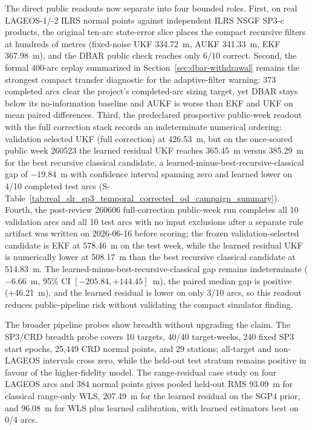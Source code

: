 \documentclass{article}
\begin{document}
The direct public readouts now separate into four bounded roles. First, on real LAGEOS-1/-2 ILRS normal points against independent ILRS NSGF SP3-c products, the original ten-arc state-error slice places the compact recursive filters at hundreds of metres (fixed-noise UKF 334.72~m, AUKF 341.33~m, EKF 367.98~m), and the DBAR public check reaches only 6/10 correct. Second, the formal 400-arc replay summarized in Section~\ref{sec:dbar-withdrawal} remains the strongest compact transfer diagnostic for the adaptive-filter warning: 373 completed arcs clear the project's completed-arc sizing target, yet DBAR stays below its no-information baseline and AUKF is worse than EKF and UKF on mean paired differences. Third, the predeclared prospective public-week readout with the full correction stack records an indeterminate numerical ordering: validation selected UKF (full correction) at 426.53~m, but on the once-scored public week 260523 the learned residual UKF reaches 365.45~m versus 385.29~m for the best recursive classical candidate, a learned-minus-best-recursive-classical gap of $-19.84$~m with confidence interval spanning zero and learned lower on 4/10 completed test arcs (S-Table~\ref{tab:real_slr_sp3_temporal_corrected_od_campaign_summary}). Fourth, the post-review 260606 full-correction public-week run completes all 10 validation arcs and all 10 test arcs with no input exclusions after a separate rule artifact was written on 2026-06-16 before scoring; the frozen validation-selected candidate is EKF at 578.46~m on the test week, while the learned residual UKF is numerically lower at 508.17~m than the best recursive classical candidate at 514.83~m. The learned-minus-best-recursive-classical gap remains indeterminate ($-6.66$~m, 95\% CI $[-205.84,+144.45]$~m), the paired median gap is positive (+46.21~m), and the learned residual is lower on only 3/10 arcs, so this readout reduces public-pipeline risk without validating the compact simulator finding.

The broader pipeline probes show breadth without upgrading the claim. The SP3/CRD breadth probe covers 10 targets, 40/40 target-weeks, 240 fixed SP3 start epochs, 25{,}449 CRD normal points, and 29 stations; all-target and non-LAGEOS intervals cross zero, while the held-out test stratum remains positive in favour of the higher-fidelity model. The range-residual case study on four LAGEOS arcs and 384 normal points gives pooled held-out RMS 93.09~m for classical range-only WLS, 207.49~m for the learned residual on the SGP4 prior, and 96.08~m for WLS plus learned calibration, with learned estimators best on 0/4 arcs.
\end{document}
